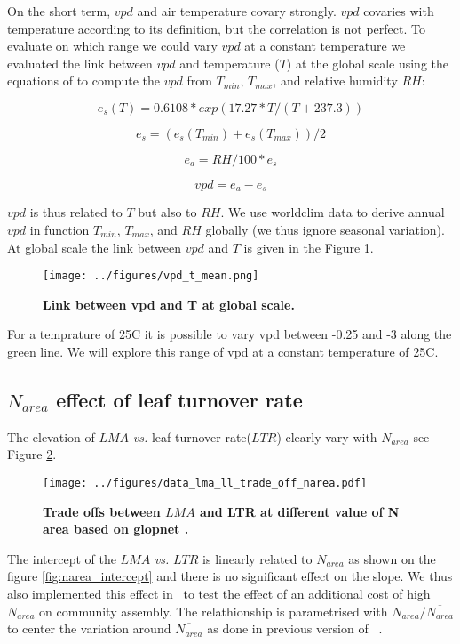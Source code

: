 \documentclass[a4paper,11pt]{article}
\begin{document}
On the short term, $vpd$ and air temperature covary strongly. $vpd$
covaries with temperature according to its definition, but the correlation is
not perfect. To evaluate on which range we could vary $vpd$ at a
constant temperature we evaluated the link between $vpd$ and
temperature ($T$) at the global scale using the equations of \citep{Allen-1998} to compute the $vpd$ from
$T_{min}$, $T_{max}$, and relative humidity $RH$:

$$e_s(T) = 0.6108 * exp(17.27 * T / (T + 237.3))$$

$$e_s = (e_s(T_{min})+e_s(T_{max}))/2 $$

$$e_a = RH / 100 * e_s $$

$$vpd = e_a - e_s$$

$vpd$ is thus related to $T$ but also to $RH$. We use worldclim data
to derive annual $vpd$ in function $T_{min}$, $T_{max}$, and $RH$
globally (we thus ignore seasonal variation). At
global scale the link between $vpd$ and $T$ is given in the Figure \ref{fig:vpd_t}.
\begin{figure}[ht]
\centering
\texttt{[image: ../figures/vpd\_t\_mean.png]}
\caption{\textbf{Link between vpd and T at global scale.}
\label{fig:vpd_t}}
\end{figure}

 For a temprature of 25C it is possible to vary vpd between -0.25 and
 -3 along the green line. We will explore this range of vpd at a
 constant temperature of 25C.
 
\clearpage
 
 \subsection{$N_{area}$ effect of leaf turnover rate}

The elevation of $LMA$ \textit{vs.} leaf turnover rate($LTR$) clearly vary with $N_{area}$ see Figure \ref{fig:narea_tradeoff}. 

\begin{figure}[ht]
\centering
\texttt{[image: ../figures/data\_lma\_ll\_trade\_off\_narea.pdf]}
\caption{\textbf{Trade offs between $LMA$ and LTR at different value of
    N area based on glopnet \citep{Wright-2004}.}
\label{fig:narea_tradeoff}}
\end{figure}

The intercept of the $LMA$ \textit{vs.} $LTR$ is linearly related to
$N_{area}$ as shown on the figure \ref{fig:narea_intercept} and there
is no significant effect on the slope. We thus also implemented this
effect in \plant\ to test the effect of an
additional cost of high $N_{area}$ on community assembly. The relathionship is
parametrised with $N_{area} / \overline{N_{area}}$ to center the
variation around $\overline{N_{area}}$ as done in previous version of
\plant\ . 
\end{document}
